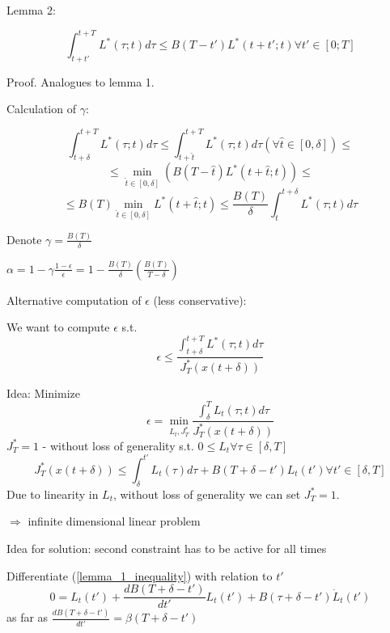 Lemma 2:

\begin{equation*}
\int_{t+t'}^{t+T}L^*(\tau;t)d\tau \leq B(T-t')L^*(t+t';t) \forall t' \in [0;T]
\end{equation*}

Proof. Analogues to lemma 1.

Calculation of $\gamma$:

\begin{equation*}
\int_{t+\delta}^{t+T} L^*(\tau;t)d\tau \leq \int_{t+\hat t}^{t+T}L^*(\tau;t)d\tau (\forall \hat t \in [0,\delta]) \leq
\end{equation*}
\begin{equation*}
\leq \min_{\hat t \in [0, \delta]}(B(T-\hat t)L^*(t+\hat t;t)) \leq
\end{equation*}
\begin{equation*}
\leq B(T)\min_{\hat t \in [0,\delta]}L^*(t+\hat t;t) \leq \frac{B(T)}{\delta}\int_{t}^{t+\delta}L^*(\tau;t)d\tau
\end{equation*}

Denote $\gamma = \frac{B(T)}{\delta}$

$\alpha = 1 - \gamma \frac{1-\epsilon}{\epsilon} = 1 - \frac{B(T)}{\delta}(\frac{B(T)}{T-\delta})$

Alternative computation of $\epsilon$ (less conservative):

We want to compute $\epsilon$ s.t.
\begin{equation*}
\epsilon \leq \frac{\int_{t+\delta}^{t+T}L^*(\tau;t)d\tau}{J_T^*(x(t+\delta))}
\end{equation*}

Idea: Minimize 
\begin{equation}\label{minimizer_eps}
\epsilon = \min_{L_t,J^*_T}\frac{\int_{\delta}^{T}L_t(\tau;t)d\tau}{J_T^*(x(t+\delta))}
\end{equation}
$J^*_T = 1$ - without loss of generality
s.t. $0 \leq L_t \forall \tau \in [\delta,T]$
\begin{equation*}
J^*_T(x(t+\delta)) \leq \int_{\delta}^{t'}L_t(\tau)d\tau + B(T+\delta-t')L_t(t') \forall t' \in [\delta, T]
\end{equation*}
Due to linearity in $L_t$, without loss of generality we can set $J_T^* = 1$.

$\Rightarrow$ infinite dimensional linear problem

Idea for solution:
second constraint has to be active for all times 

Differentiate (\ref{lemma_1_inequality}) with relation to $t'$ 
\begin{equation*}
0 = L_t(t') + \frac{dB(T+\delta-t')}{dt'}L_t(t') + B(\tau + \delta - t') \dot L_t(t')
\end{equation*} 
as far as $\frac{dB(T+\delta-t')}{dt'} = \beta(T+\delta - t')$

